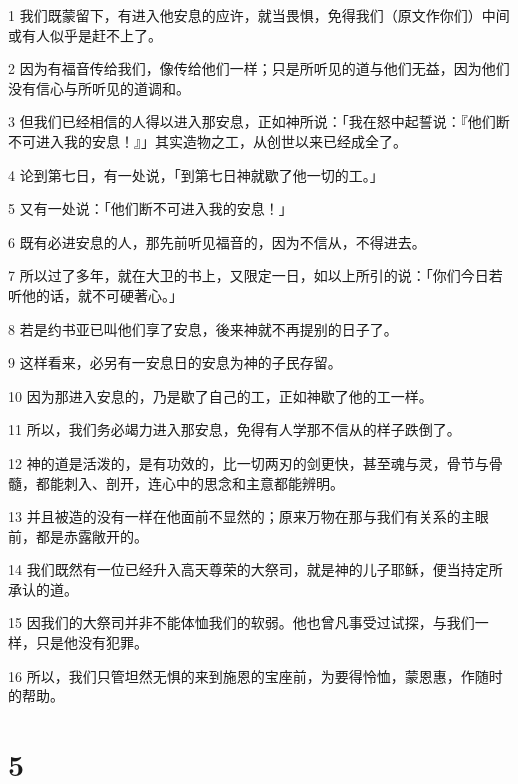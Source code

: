 \par 1 我们既蒙留下，有进入他安息的应许，就当畏惧，免得我们（原文作你们）中间或有人似乎是赶不上了。
\par 2 因为有福音传给我们，像传给他们一样；只是所听见的道与他们无益，因为他们没有信心与所听见的道调和。
\par 3 但我们已经相信的人得以进入那安息，正如神所说：「我在怒中起誓说：『他们断不可进入我的安息！』」其实造物之工，从创世以来已经成全了。
\par 4 论到第七日，有一处说，「到第七日神就歇了他一切的工。」
\par 5 又有一处说：「他们断不可进入我的安息！」
\par 6 既有必进安息的人，那先前听见福音的，因为不信从，不得进去。
\par 7 所以过了多年，就在大卫的书上，又限定一日，如以上所引的说：「你们今日若听他的话，就不可硬著心。」
\par 8 若是约书亚已叫他们享了安息，後来神就不再提别的日子了。
\par 9 这样看来，必另有一安息日的安息为神的子民存留。
\par 10 因为那进入安息的，乃是歇了自己的工，正如神歇了他的工一样。
\par 11 所以，我们务必竭力进入那安息，免得有人学那不信从的样子跌倒了。
\par 12 神的道是活泼的，是有功效的，比一切两刃的剑更快，甚至魂与灵，骨节与骨髓，都能刺入、剖开，连心中的思念和主意都能辨明。
\par 13 并且被造的没有一样在他面前不显然的；原来万物在那与我们有关系的主眼前，都是赤露敞开的。
\par 14 我们既然有一位已经升入高天尊荣的大祭司，就是神的儿子耶稣，便当持定所承认的道。
\par 15 因我们的大祭司并非不能体恤我们的软弱。他也曾凡事受过试探，与我们一样，只是他没有犯罪。
\par 16 所以，我们只管坦然无惧的来到施恩的宝座前，为要得怜恤，蒙恩惠，作随时的帮助。

\chapter{5}

